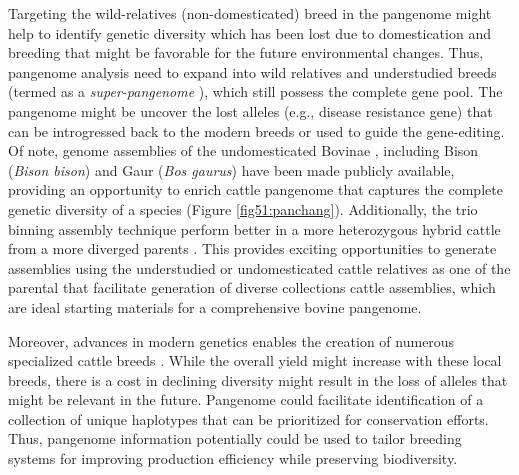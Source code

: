 \documentclass[../main.tex]{subfiles}
\begin{document}
Targeting the wild-relatives (non-domesticated) breed in the pangenome might help to identify genetic diversity which has been lost due to domestication and breeding that might be favorable for the future environmental changes. Thus, pangenome analysis need to expand into wild relatives and understudied breeds (termed as a \emph{super-pangenome} \citep{khan2020super}), which still possess the complete gene pool. The pangenome might be uncover the lost alleles (e.g., disease resistance gene) that can be introgressed back to the modern breeds or used to guide the gene-editing. Of note, genome assemblies of the undomesticated Bovinae \citep{wu2018pervasive}, including Bison (\emph{Bison bison})  and Gaur (\emph{Bos gaurus}) have been made publicly available, providing an opportunity to enrich cattle pangenome that captures the complete genetic diversity of a species (Figure \ref{fig51:panchang}). Additionally, the trio binning assembly technique perform better in a more heterozygous hybrid cattle from a more diverged parents \citep{rice2020continuous,heaton2021reference}. This provides exciting opportunities to generate assemblies using the understudied or undomesticated cattle relatives as one of the parental that facilitate generation of diverse collections cattle assemblies, which are ideal starting materials for a comprehensive bovine pangenome. 

Moreover, advances in modern genetics enables the creation of numerous specialized cattle breeds \citep{signer2017population,upadhyay2019genomic}. While the overall yield might increase with these local breeds, there is a cost in declining diversity might result in the loss of alleles that might be relevant in the future. Pangenome could facilitate identification of a collection of unique haplotypes that can be prioritized for conservation efforts. Thus, pangenome information potentially could be used to tailor breeding systems for improving production efficiency while preserving biodiversity.



\singlespacing
\footnotesize






\ifdefined\BuildingFromMainFile
\else
   
\end{document}

